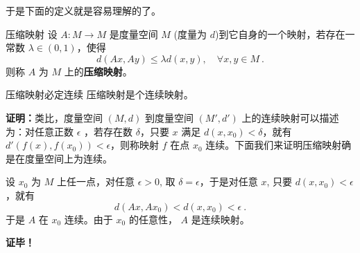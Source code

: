 于是下面的定义就是容易理解的了。
\begin{definition}{压缩映射}
设 $A:M\rightarrow M$ 是度量空间 $M$ (度量为 $d$)到它自身的一个映射，若存在一常数 $\lambda\in(0,1)$，使得
\begin{equation}
d(Ax,Ay)\leq \lambda d(x,y),\quad \forall x,y\in M~.
\end{equation}
 则称 $A$ 为 $M$ 上的\textbf{压缩映射}。
\end{definition}
\begin{theorem}{压缩映射必定连续}
压缩映射是个连续映射。
\end{theorem}
\textbf{证明：}类比，度量空间 $(M,d)$ 到度量空间 $(M',d')$ 上的连续映射可以描述为：对任意正数 $\epsilon$ ，若存在数 $\delta$，只要 $x$ 满足 $d(x,x_0)<\delta$，就有 $d'(f(x),f(x_0))<\epsilon$，则称映射 $f$ 在点 $x_0$ 连续。下面我们来证明压缩映射确是在度量空间上为连续。

设 $x_0$ 为 $M$ 上任一点，对任意 $\epsilon>0$, 取 $\delta=\epsilon$，于是对任意 $x$, 只要 $d(x,x_0)<\epsilon$，就有
\begin{equation}
d(A x,A x_0)<d(x,x_0)<\epsilon~.
\end{equation}
于是 $A$ 在 $x_0$ 连续。由于 $x_0$ 的任意性， $A$ 是连续映射。



\textbf{证毕！}